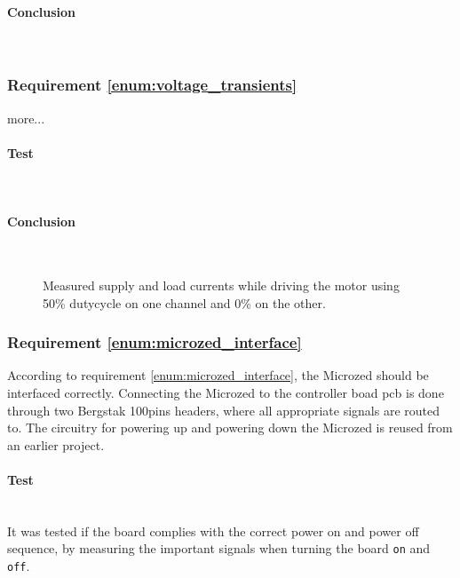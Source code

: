 \paragraph{Conclusion}~\\


\subsubsection{Requirement \ref{enum:voltage_transients}} %
\label{ssub:requirement_enum:voltage_transients}
more...

\paragraph{Test}~\\

\paragraph{Conclusion}~\\
\begin{figure}[h]
	\centering
    
	\caption[Measured supply and load currents.]{Measured supply and load currents while driving the motor using 50\% dutycycle on one channel and 0\% on the other.}
	\label{fig:controllerboardv2_}
\end{figure}

\subsubsection{Requirement \ref{enum:microzed_interface}} %
\label{ssub:requirement_enum:microzed_interface}
According to requirement  \ref{enum:microzed_interface}, the Microzed should be interfaced correctly.
Connecting the Microzed to the controller boad pcb is done through two Bergstak 100pins headers, where all appropriate signals are routed to.
The circuitry for powering up and powering down the Microzed is reused from an earlier project.

\paragraph{Test}~\\
It was tested if the board complies with the correct power on and power off sequence, by measuring the important signals when turning the board \texttt{on} and \texttt{off}.

